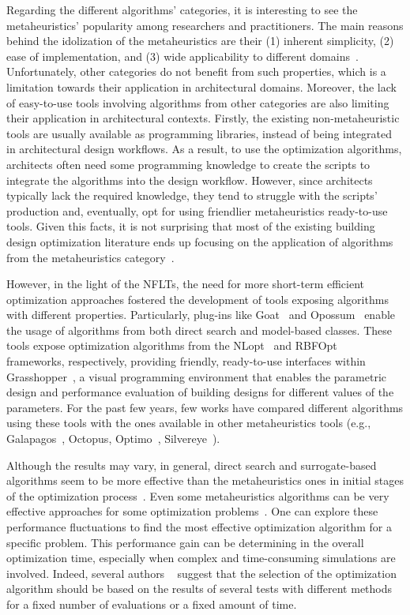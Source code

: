 Regarding the different algorithms' categories, it is interesting to see the metaheuristics' popularity among researchers and practitioners. The main reasons behind the idolization of the metaheuristics are their (1) inherent simplicity, (2) ease of implementation, and (3) wide applicability to different domains~\cite{Wortmann2017ADO}. Unfortunately, other categories do not benefit from such properties, which is a limitation towards their application in architectural domains. Moreover, the lack of easy-to-use tools involving algorithms from other categories are also limiting their application in architectural contexts. Firstly, the existing non-metaheuristic tools are usually available as programming libraries, instead of being integrated in architectural design workflows. As a result, to use the optimization algorithms, architects often need some programming knowledge to create the scripts to integrate the algorithms into the design workflow. However, since architects typically lack the required knowledge, they tend to struggle with the scripts' production and, eventually, opt for using friendlier metaheuristics ready-to-use tools. Given this facts, it is not surprising that most of the existing building design optimization literature ends up focusing on the application of algorithms from the metaheuristics category~\cite{Hamdy2016,Nguyen2014,Evins2013}. 
		
However, in the light of the \acp{NFLT}, the need for more short-term efficient optimization approaches fostered the development of tools exposing algorithms with different properties. Particularly, plug-ins like Goat~\cite{GOAT} and Opossum~\cite{Wortmann2017Opossum} enable the usage of algorithms from both direct search and model-based classes. These tools expose optimization algorithms from the NLopt~\cite{NLOPT} and RBFOpt~\cite{RBFOPT} frameworks, respectively, providing friendly, ready-to-use interfaces within Grasshopper~\cite{GRASSHOPPER}, a visual programming environment that enables the parametric design and performance evaluation of building designs for different values of the parameters. For the past few years, few works have compared different algorithms using these tools with the ones available in other metaheuristics tools (e.g., Galapagos~\cite{GALAPAGOS}, Octopus\cite{OCTOPUS}, Optimo~\cite{OPTIMO}, Silvereye~\cite{Cichocka2017SILVEREYE}).
	
Although the results may vary, in general, direct search and surrogate-based algorithms seem to be more effective than the metaheuristics ones in initial stages of the optimization process~\cite{Wortmann2017,Wortmann2016BBO,Wortmann2017GABESTCHOICE}. Even some metaheuristics algorithms can be very effective approaches for some optimization problems~\cite{Waibel2018}. One can explore these performance fluctuations to find the most effective optimization algorithm for a specific problem. This performance gain can be determining in the overall optimization time, especially when complex and time-consuming simulations are involved. Indeed, several authors ~\cite{Wortmann2016BBO,Hamdy2016} suggest that the selection of the optimization algorithm should be based on the results of several tests with different methods for a fixed number of evaluations or a fixed amount of time. 

